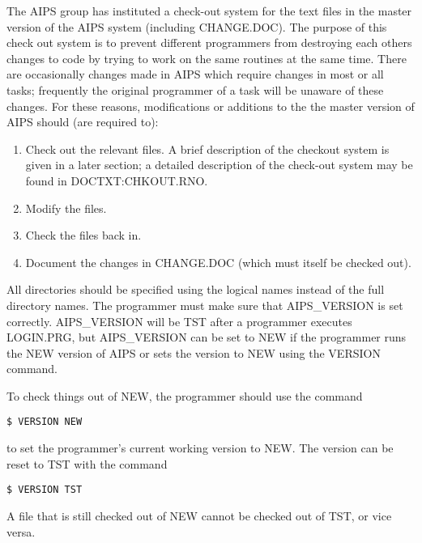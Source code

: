 The AIPS group has instituted a check-out system for the text files in
the master version of the AIPS system (including CHANGE.DOC).  The
purpose of this check out system is to prevent different programmers
from destroying each others changes to code by trying to work on the
same routines at the same time.  There are occasionally changes made
in AIPS which require changes in most or all tasks; frequently the
original programmer of a task will be unaware of these changes.  For
these reasons, modifications or additions to the the master version of
AIPS should (are required to):
\begin{enumerate} %
\item Check out the relevant files.  A brief description of the
checkout system is given in a later section; a detailed description of
the check-out system may be found in DOCTXT:CHKOUT.RNO.
\item Modify the files.
\item Check the files back in.
\item Document the changes in CHANGE.DOC (which must itself be checked out).
\end{enumerate} %

All directories should be specified using the logical names
instead of the full directory names. The programmer must make sure
that AIPS\_VERSION is set correctly.  AIPS\_VERSION will be TST after
a programmer executes LOGIN.PRG, but AIPS\_VERSION can be set to NEW
if the programmer runs the NEW version of AIPS or sets the version to
NEW using the VERSION command.

To check things out of NEW, the programmer should use the command

\begin{verbatim}
$ VERSION NEW

\end{verbatim}

to set the programmer's current working version to NEW.  The version
can be reset to TST with the command

\begin{verbatim}
$ VERSION TST

\end{verbatim}
A file that is still checked out of NEW cannot be checked out of TST,
or vice versa.

